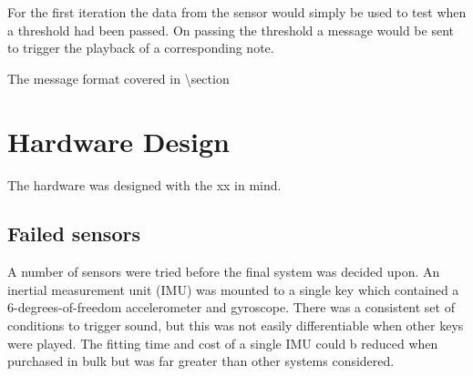 For the first iteration the data from the sensor would simply be used to
test when a threshold had been passed. On passing the threshold a
message would be sent to trigger the playback of a corresponding note.

The message format covered in \textbackslash section



\section{Hardware Design}\label{hardware-design}

The hardware was designed with the xx in mind.



\subsection{Failed sensors}\label{failed-sensors}

A number of sensors were tried before the final system was decided upon.
An inertial measurement unit (IMU) was mounted to a single key which
contained a 6-degrees-of-freedom accelerometer and gyroscope. There was
a consistent set of conditions to trigger sound, but this was not easily
differentiable when other keys were played. The fitting time and cost of
a single IMU could b reduced when purchased in bulk but was far greater
than other systems considered.

